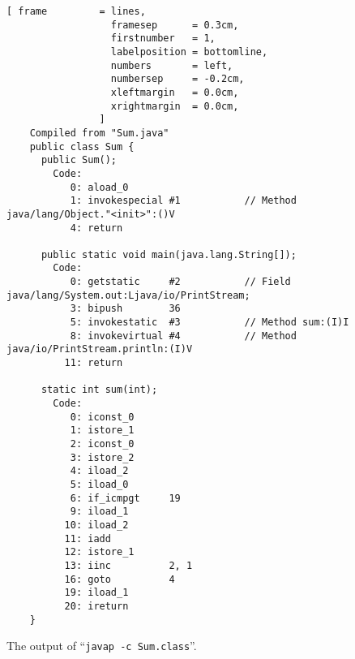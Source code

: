 \begin{figure}[!ht]
\centering
\begin{Verbatim}[ frame         = lines, 
                  framesep      = 0.3cm, 
                  firstnumber   = 1,
                  labelposition = bottomline,
                  numbers       = left,
                  numbersep     = -0.2cm,
                  xleftmargin   = 0.0cm,
                  xrightmargin  = 0.0cm,
                ]
    Compiled from "Sum.java"
    public class Sum {
      public Sum();
        Code:
           0: aload_0       
           1: invokespecial #1           // Method java/lang/Object."<init>":()V
           4: return        
    
      public static void main(java.lang.String[]);
        Code:
           0: getstatic     #2           // Field java/lang/System.out:Ljava/io/PrintStream;
           3: bipush        36
           5: invokestatic  #3           // Method sum:(I)I
           8: invokevirtual #4           // Method java/io/PrintStream.println:(I)V
          11: return        
    
      static int sum(int);
        Code:
           0: iconst_0      
           1: istore_1      
           2: iconst_0      
           3: istore_2      
           4: iload_2       
           5: iload_0       
           6: if_icmpgt     19
           9: iload_1       
          10: iload_2       
          11: iadd          
          12: istore_1      
          13: iinc          2, 1
          16: goto          4
          19: iload_1       
          20: ireturn       
    }
\end{Verbatim}
\vspace*{-0.3cm}
\caption{The output of ``\texttt{javap -c Sum.class}''.}
\label{fig:Sum.class}
\end{figure}
\vspace*{\fill}

